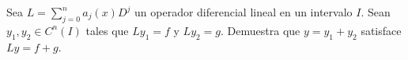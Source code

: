 Sea \(L=\sum_{j=0}^{n}a_j(x)D^j\) un operador diferencial lineal en un intervalo \(I\). Sean \(y_1,y_2\in C^n(I)\) tales que \(Ly_1=f\) y \(Ly_2=g\). Demuestra que \(y=y_1+y_2\) satisface \(Ly=f+g\).
